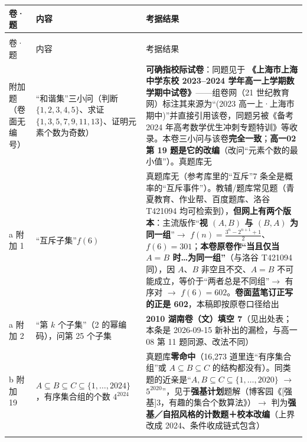 \documentclass[a4paper,11pt]{article}
\begin{document}
\newcommand{\tabhdrM}{\rowcolor{white} 卷·题 & 内容 & 考据结果 \\}
\begin{xltabular}{\textwidth}{@{}>{\raggedright\arraybackslash}p{2.01cm}>{\raggedright\arraybackslash}p{4.95cm}>{\raggedright\arraybackslash}p{7.78cm}@{}}
\toprule
\tabhdrM
\midrule
\endfirsthead
{} \\
\midrule
\tabhdrM
\midrule
\endhead
\bottomrule
{} 附加题（卷面无编号） & ``和谐集''三小问（判断 \(\{1,\allowbreak 2,\allowbreak 3,\allowbreak 4,\allowbreak 5\}\)、求证 \(\{1,\allowbreak 3,\allowbreak 5,\allowbreak 7,\allowbreak 9,\allowbreak 11,\allowbreak 13\}\)、证明元素个数为奇数） & \textbf{可确指校际试卷}：同题见于 \textbf{《上海市上海中学东校 2023--2024 学年高一上学期数学期中试卷》}------组卷网（21 世纪教育网）标注其来源为``(2023 高一上·上海市期中)''并直接引用该卷，同题另被《备考 2024 年高考数学优生冲刺专题特训》等收录。本卷三小问与该卷\textbf{完全一致}；\textbf{高一02 第 19 题是它的改编}（改问``元素个数的最小值''）。真题库无 \\ \addlinespace[1pt]
a 附加 1 & ``互斥子集''\(f(6)\) & 真题库无（参考库里的``互斥''7 条全是概率的``互斥事件''）。教辅/题库常见题（青夏教育、作业帮、百度题库、洛谷 T421094 均可检索到），\textbf{但网上有两个版本}：主流版作``\textbf{视 \((A,B)\) 与 \((B,A)\) 为同一组}''$\to$ \(f(n)=\allowbreak \frac{3^n-2^{n+\allowbreak 1}+\allowbreak 1}{2}\)、\(f(6)=\allowbreak 301\)；\textbf{本卷原卷作``当且仅当 \(A=B\) 时\ldots 为同一组''}（与洛谷 T421094 同），因 \(A\)、\(B\) 非空且不交、\(A=B\) 不可能成立，等价于``两者总是不同组''$\to$ 有序对 $\to$ \(f(6)=\allowbreak 602\)。\textbf{卷面蓝笔订正写的正是 602}，本稿即按原卷口径给出 \\ \addlinespace[1pt]
a 附加 2 & ``第 \(k\) 个子集''（2 的幂编码），问第 25 个子集 & \textbf{2010 湖南卷（文）填空 7}（见出处表；本条是 2026-09-15 新补出的漏检，与高一08 第 11 题同源、改法不同） \\ \addlinespace[1pt]
b 附加 19 & \(A\subseteq\allowbreak  B\subseteq\allowbreak  C\subseteq\allowbreak \{1,\allowbreak \dots,\allowbreak 2024\}\)，有序集合组的个数 \(4^{2024}\) & 真题库\textbf{零命中}（16,273 道里连``有序集合组''或 \(A\subseteq\allowbreak  B\subseteq\allowbreak  C\) 的结构都没有）。同类题的近亲是``\(A,B\subseteq\allowbreak  C\subseteq\allowbreak \{1,\allowbreak \dots,\allowbreak 2020\}\) $\to$ \(5^{2020}\)''，见于\textbf{强基计划}题解（博客园《{[}强基{]}3，有趣的集合个数算法》）$\to$ 判为\textbf{强基／自招风格的计数题＋校本改编}（上界改成 2024、条件收成链式包含） \\ \addlinespace[1pt]

\end{xltabular}
\end{document}
